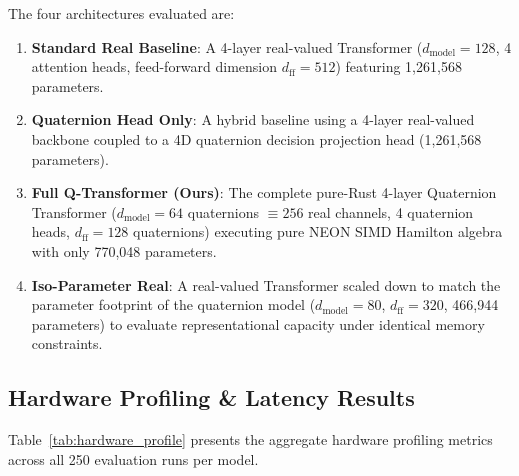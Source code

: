 \documentclass[10pt,twocolumn,letterpaper]{article}
\begin{document}
The four architectures evaluated are:
\begin{enumerate}
    \item \textbf{Standard Real Baseline}: A 4-layer real-valued Transformer ($d_{\text{model}} = 128$, 4 attention heads, feed-forward dimension $d_{\text{ff}} = 512$) featuring 1,261,568 parameters.
    \item \textbf{Quaternion Head Only}: A hybrid baseline using a 4-layer real-valued backbone coupled to a 4D quaternion decision projection head (1,261,568 parameters).
    \item \textbf{Full Q-Transformer (Ours)}: The complete pure-Rust 4-layer Quaternion Transformer ($d_{\text{model}} = 64$ quaternions $\equiv 256$ real channels, 4 quaternion heads, $d_{\text{ff}} = 128$ quaternions) executing pure NEON SIMD Hamilton algebra with only 770,048 parameters.
    \item \textbf{Iso-Parameter Real}: A real-valued Transformer scaled down to match the parameter footprint of the quaternion model ($d_{\text{model}} = 80$, $d_{\text{ff}} = 320$, 466,944 parameters) to evaluate representational capacity under identical memory constraints.
\end{enumerate}


\subsection{Hardware Profiling \& Latency Results}
Table~\ref{tab:hardware_profile} presents the aggregate hardware profiling metrics across all 250 evaluation runs per model. 

\begin{table}[htbp]
\centering
\caption{Hardware execution metrics and latency distribution across 5 independent seeds (Mean $\pm$ Standard Error, $N=250$) on Raspberry Pi 4 Model B.}
\label{tab:hardware_profile}
\end{table}
\end{document}

